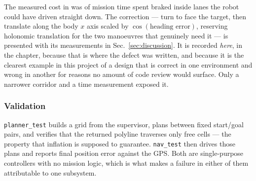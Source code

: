 The measured cost in \phaseB{} was  of mission time spent
braked inside lanes the robot could have driven straight down. The
correction --- turn to face the target, then translate along the body
$x$ axis scaled by $\cos(\text{heading error})$, reserving holonomic
translation for the two manoeuvres that genuinely need it --- is
presented with its measurements in Sec.~\ref{sec:discussion}. It is
recorded \emph{here}, in the \phaseA{} chapter, because that is where
the defect was written, and because it is the clearest example in this
project of a design that is correct in one environment and wrong in
another for reasons no amount of code review would surface. Only a
narrower corridor and a time measurement exposed it.

\subsubsection{Validation}

\texttt{planner\_test} builds a grid from the supervisor, plans between
fixed start/goal pairs, and verifies that the returned polyline
traverses only free cells --- the property that inflation is supposed to
guarantee. \texttt{nav\_test} then drives those plans and reports final
position error against the GPS. Both are single-purpose controllers with
no mission logic, which is what makes a failure in either of them
attributable to one subsystem.

